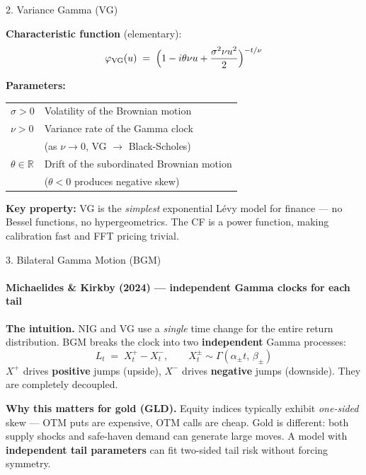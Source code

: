 \documentclass[aspectratio=169]{beamer}
\begin{document}
\begin{frame}{2. Variance Gamma (VG)}

\textbf{Characteristic function} (elementary):
\[
\varphi_{\text{VG}}(u) \;=\;
\Bigl(
1 - i\theta\nu u + \frac{\sigma^2\nu u^2}{2}
\Bigr)^{-t/\nu}
\]

\vspace{0.2cm}
\textbf{Parameters:}
\quad
\begin{tabular}{@{}ll@{}}\toprule
$\sigma > 0$ & Volatility of the Brownian motion\\
$\nu > 0$ & Variance rate of the Gamma clock\\
& \quad (as $\nu \to 0$, VG $\to$ Black-Scholes)\\
$\theta \in \mathbb{R}$ & Drift of the subordinated Brownian motion\\
& \quad ($\theta < 0$ produces negative skew)\\\bottomrule
\end{tabular}

\vspace{0.2cm}
\textbf{Key property:} VG is the \emph{simplest} exponential L\'evy model for finance --- no Bessel functions, no hypergeometrics. The CF is a power function, making calibration fast and FFT pricing trivial.

\end{frame}

\begin{frame}{3. Bilateral Gamma Motion (BGM)}
\framesubtitle{Michaelides \& Kirkby (2024) --- independent Gamma clocks for each tail}

\textbf{The intuition.} NIG and VG use a \emph{single} time change for the entire return distribution. BGM breaks the clock into two \textbf{independent} Gamma processes:
\[
L_t \;=\; X_t^+ - X_t^-, \qquad
X_t^\pm \sim \Gamma(\alpha_\pm t,\, \beta_\pm)
\]
$X^+$ drives \textbf{positive} jumps (upside), $X^-$ drives \textbf{negative} jumps (downside). They are completely decoupled.

\vspace{0.2cm}
\textbf{Why this matters for gold (GLD).} Equity indices typically exhibit \emph{one-sided} skew --- OTM puts are expensive, OTM calls are cheap. Gold is different: both supply shocks and safe-haven demand can generate large moves. A model with \textbf{independent tail parameters} can fit two-sided tail risk without forcing symmetry.

\end{frame}
\end{document}
